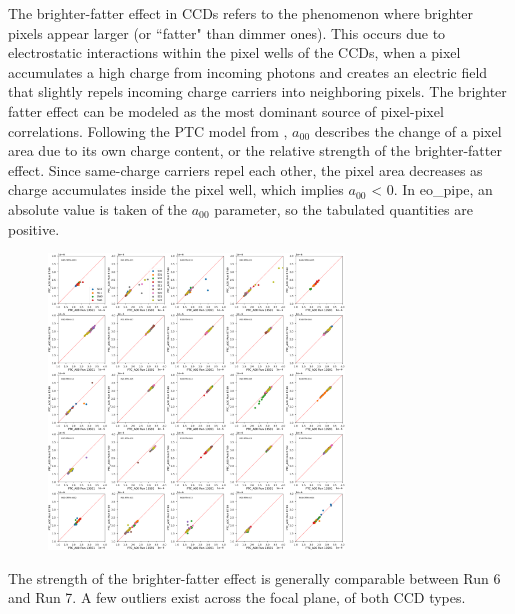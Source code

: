The brighter-fatter effect in CCDs refers to the phenomenon where brighter pixels appear larger (or ``fatter" than dimmer ones). This occurs due to electrostatic interactions within the pixel wells of the CCDs, when a pixel accumulates a high charge from incoming photons and creates an electric field that slightly repels incoming charge carriers into neighboring pixels. The brighter fatter effect can be modeled as the most dominant source of pixel-pixel correlations. Following the PTC model from %
\citet{2019A&A...629A..36A}, $a_{00}$ describes the change of a pixel area due to its own charge content, or the relative strength of the brighter-fatter effect. Since same-charge carriers repel each other, the pixel area decreases as charge accumulates inside the pixel well, which implies $a_{00}$ \textless{} 0. In eo\_pipe, an absolute value is taken of the $a_{00}$ parameter, so the tabulated quantities are positive.

\begin{figure}[H]
\begin{centering}
\includegraphics[width=0.7\textwidth]{figures/baselineCharacterization/13591_E749_PTC_A00.png}
\end{centering}
\end{figure}

The strength of the brighter-fatter effect is generally comparable between Run 6 and Run 7. A few outliers exist across the
focal plane, of both CCD types.

